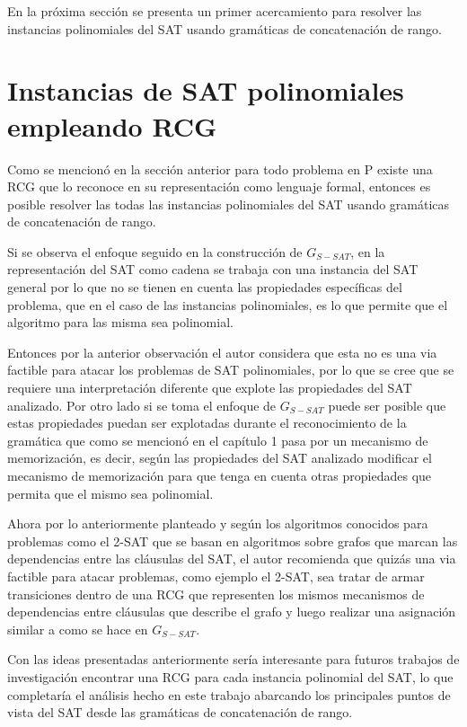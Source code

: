 En la próxima sección se presenta un primer acercamiento para resolver las instancias polinomiales del SAT usando gramáticas
de concatenación de rango.

\section{Instancias de SAT polinomiales empleando RCG}

Como se mencionó en la sección anterior para todo problema en P existe una RCG que lo reconoce en su representación
como lenguaje formal, entonces es posible resolver las todas las instancias polinomiales del SAT usando gramáticas de concatenación
de rango.

Si se observa el enfoque seguido en la construcción de $G_{S-SAT}$, en la representación del SAT como cadena se
trabaja con una instancia del SAT general por lo que no se tienen en cuenta las propiedades específicas del problema,
que en el caso de las instancias polinomiales, es lo que permite que el algoritmo para las misma sea polinomial.

Entonces por la anterior observación el autor considera que esta no es una via factible para atacar los problemas
de SAT polinomiales, por lo que se cree que se requiere una interpretación diferente que explote las propiedades del
SAT analizado. Por otro lado si se toma el enfoque de $G_{S-SAT}$ puede ser posible que estas propiedades puedan ser
explotadas durante el reconocimiento de la gramática que como se mencionó en el capítulo 1 pasa por un mecanismo de
memorización, es decir, según las propiedades del SAT analizado modificar el mecanismo de memorización para que tenga
en cuenta otras propiedades que permita que el mismo sea polinomial.

Ahora por lo anteriormente planteado y según los algoritmos conocidos para problemas como el 2-SAT que se basan
en algoritmos sobre grafos que marcan las dependencias entre las cláusulas del SAT, el autor recomienda que quizás
una via factible para atacar problemas, como ejemplo el 2-SAT, sea tratar de armar transiciones dentro de una RCG
que representen los mismos mecanismos de dependencias entre cláusulas que describe el grafo y luego realizar una asignación
similar a como se hace en $G_{S-SAT}$.

Con las ideas presentadas anteriormente sería interesante para futuros trabajos de investigación encontrar una RCG para cada
instancia polinomial del SAT, lo que completaría el análisis hecho en este trabajo abarcando los principales puntos de
vista del SAT desde las gramáticas de concatenación de rango.
